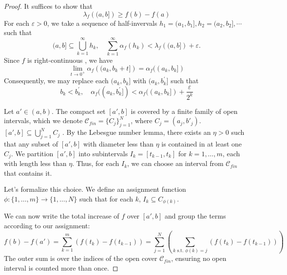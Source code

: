 \documentclass[../main.tex]{subfiles}
\begin{document}
\begin{proof}
    It suffices to show that \[
     \lambda _{f}\left( (a,b] \right)\ge f\left( b \right)-f\left( a \right)   
    \]For each \(   \varepsilon > 0  \), we take a sequence of half-invervals \(  h_1= (a_1,b_1],h_2= (a_2,b_2],\cdots   \) such that \[
    (a,b] \subseteq \bigcup _{k = 1}^{\infty}h_{k},\quad \sum _{k = 1}^{\infty}\alpha _{f}\left( h_{k} \right)<  \lambda _{f}\left( (a,b] \right)+  \varepsilon   .
    \]  Since \(  f  \) is right-continuous , we have \[
    \lim_{t \to 0^{+ }} \alpha _{f}\left( (a_{k},b_{k}+ t] \right)= \alpha _{f}((a_{k},b_{k}])
    \] Consequently, we may replace each \(  (a_{k},b_{k}]  \) with \(  (a_{k},b_{k}^{\prime} ]  \)  such that   \[
    b_{k}< b_{k}^{\prime} ,\quad   \alpha _{f}((a_{k},b_{k}^{\prime} ])< \alpha _{f}((a_{k},b_{k}]) + \frac{ \varepsilon  }{2^{k} } 
    \] 
    
    Let $a' \in (a, b)$. The compact set $[a', b]$ is covered by a finite family of open intervals, which we denote $\mathcal{C}_{fin} = \{ C_j \}_{j=1}^N$, where $C_j = (a_j, b'_j)$.
$[a', b] \subseteq \bigcup_{j=1}^N C_j$
. By the Lebesgue number lemma, there exists an $\eta > 0$ such that any subset of $[a', b]$ with diameter less than $\eta$ is contained in at least one $C_j$. We partition $[a', b]$ into subintervals $I_k = [t_{k-1}, t_k]$ for $k=1, \dots, m$, each with length less than $\eta$. Thus, for each $I_k$, we can choose an interval from $\mathcal{C}_{fin}$ that contains it.

Let's formalize this choice. We define an assignment function $\phi: \{1, \dots, m\} \to \{1, \dots, N\}$ such that for each $k$, $I_k \subseteq C_{\phi(k)}$. 

We can now write the total increase of $f$ over $[a', b]$ and group the terms according to our assignment:
$$f(b) - f(a') = \sum_{k=1}^m (f(t_k) - f(t_{k-1})) = \sum_{j=1}^N \left( \sum_{k \text{ s.t. } \phi(k)=j} (f(t_k) - f(t_{k-1})) \right)$$
The outer sum is over the indices of the open cover $\mathcal{C}_{fin}$, ensuring no open interval is counted more than once.


\end{proof}
\end{document}
